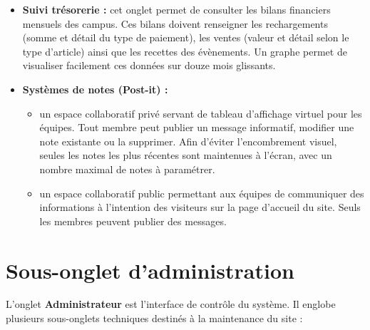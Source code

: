 \documentclass[a4paper,11pt]{article}
\begin{document}
\begin{itemize}
    \item \textbf{Suivi trésorerie :} cet onglet permet de consulter les bilans financiers mensuels des campus. Ces bilans doivent renseigner les rechargements (somme et détail du type de paiement), les ventes (valeur et détail selon le type d'article) ainsi que les recettes des évènements. Un graphe permet de visualiser facilement ces données sur douze mois glissants.
    \item \textbf{Systèmes de notes (Post-it) :} 
    \begin{itemize}
        \item un espace collaboratif privé servant de tableau d'affichage virtuel pour les équipes. Tout membre peut publier un message informatif, modifier une note existante ou la supprimer. Afin d'éviter l'encombrement visuel, seules les notes les plus récentes sont maintenues à l'écran, avec un nombre maximal de notes à paramétrer.
        \item un espace collaboratif public permettant aux équipes de communiquer des informations à l'intention des visiteurs sur la page d'accueil du site. Seuls les membres peuvent publier des messages.
    \end{itemize}
\end{itemize}

\section{Sous-onglet d'administration}
L'onglet \textbf{Administrateur} est l'interface de contrôle du système. Il englobe plusieurs sous-onglets techniques destinés à la maintenance du site :
\end{document}
